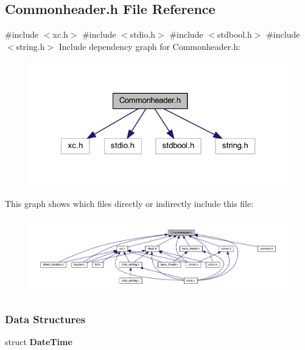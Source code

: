 \subsection{Commonheader.\+h File Reference}
\label{a00023}
{\ttfamily \#include $<$xc.\+h$>$}\newline
{\ttfamily \#include $<$stdio.\+h$>$}\newline
{\ttfamily \#include $<$stdbool.\+h$>$}\newline
{\ttfamily \#include $<$string.\+h$>$}\newline
Include dependency graph for Commonheader.\+h\+:
\nopagebreak
\begin{figure}[H]
\begin{center}
\leavevmode
\includegraphics[width=321pt]{a00024}
\end{center}
\end{figure}
This graph shows which files directly or indirectly include this file\+:
\nopagebreak
\begin{figure}[H]
\begin{center}
\leavevmode
\includegraphics[width=350pt]{a00025}
\end{center}
\end{figure}
\subsubsection*{Data Structures}
\begin{DoxyCompactItemize}
\item 
struct \textbf{ Date\+Time}
\end{DoxyCompactItemize}
